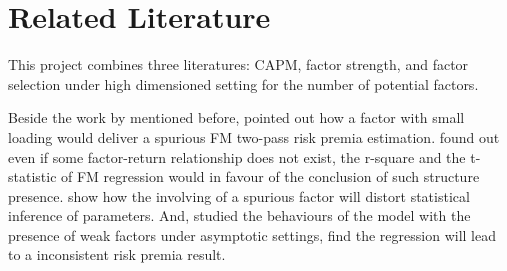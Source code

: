 \documentclass[12pt]{article}
\begin{document}














	\section{Related Literature}
This project combines three literatures: CAPM, factor strength, and factor selection under high dimensioned setting for the number of potential factors.


Beside the work by  mentioned before,  pointed out how a factor with small loading would deliver a spurious FM two-pass risk premia estimation. 
 found out even if some factor-return relationship does not exist, the r-square and the t-statistic of FM regression would in favour of the conclusion of such structure presence. 
 show how the involving of a spurious factor will distort statistical inference of parameters.
And,  studied the behaviours of the model with the presence of weak factors under asymptotic settings, find the regression will lead to a inconsistent risk premia result.
	
\end{document}
